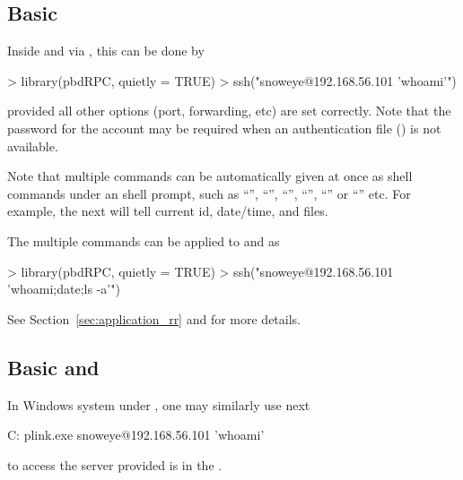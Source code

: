\subsection[Basic \code{ssh()}]{Basic }
\label{sec:basic_ssh}

Inside  and via , this can be done by
\begin{Code}[title=Basic \code{ssh()} in \pkg{pbdRPC} and \proglang{R}]
> library(pbdRPC, quietly = TRUE)
> ssh("snoweye@192.168.56.101 'whoami'")
\end{Code}
provided all other options (port, forwarding, etc) are set correctly.
Note that the password for the account may be required when an
authentication file () is not available.

Note that multiple commands can be automatically given at once
as shell commands under an shell prompt, such as ``\code{;}'', ``\code{\&\&}'',
``\code{>}'', ``\code{<}'', ``\code{|}'' or ``\code{\&}'' etc.
For example, the next will tell current id, date/time, and files.
The multiple commands can be applied to  and  as
\begin{Code}[title=Multipel commands to \code{ssh()} in \pkg{pbdRPC} and \proglang{R}]
> library(pbdRPC, quietly = TRUE)
> ssh("snoweye@192.168.56.101 'whoami;date;ls -a'")
\end{Code}
See Section~\ref{sec:application_rr} and  for
more details.


\subsection[Basic \code{plink.exe} and \code{plink()}]{Basic  and }
\label{sec:basic_plink}

In Windows system under , one may similarly use next
\begin{Command}[title=Basic \code{plink.exe} in \code{cmd.exe}]
C:\> plink.exe snoweye@192.168.56.101 'whoami'
\end{Command}
to access the server provided  is in the .

